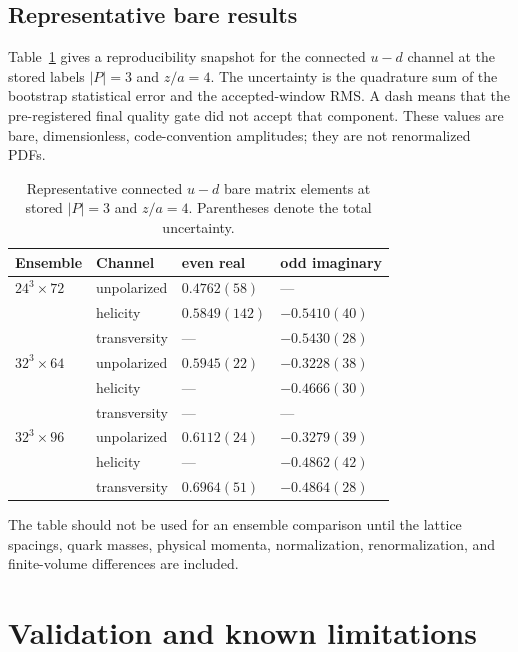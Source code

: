 \documentclass[11pt]{article}
\numberwithin{equation}{section}
\begin{document}
\subsection{Representative bare results}

Table~\ref{tab:representative-results} gives a reproducibility snapshot for
the connected $u-d$ channel at the stored labels $|P|=3$ and $z/a=4$.  The
uncertainty is the quadrature sum of the bootstrap statistical error and the
accepted-window RMS.  A dash means that the pre-registered final quality gate
did not accept that component.  These values are bare, dimensionless,
code-convention amplitudes; they are not renormalized PDFs.

\begin{table}[htbp]
\centering
\caption{Representative connected $u-d$ bare matrix elements at stored
$|P|=3$ and $z/a=4$.  Parentheses denote the total uncertainty.}
\label{tab:representative-results}
\begin{tabular}{llll}
\toprule
Ensemble & Channel & even real & odd imaginary\\
\midrule
$24^3\times72$ & unpolarized & $0.4762(58)$ & ---\\
                 & helicity & $0.5849(142)$ & $-0.5410(40)$\\
                 & transversity & --- & $-0.5430(28)$\\
\addlinespace
$32^3\times64$ & unpolarized & $0.5945(22)$ & $-0.3228(38)$\\
                 & helicity & --- & $-0.4666(30)$\\
                 & transversity & --- & ---\\
\addlinespace
$32^3\times96$ & unpolarized & $0.6112(24)$ & $-0.3279(39)$\\
                 & helicity & --- & $-0.4862(42)$\\
                 & transversity & $0.6964(51)$ & $-0.4864(28)$\\
\bottomrule
\end{tabular}
\end{table}

The table should not be used for an ensemble comparison until the lattice
spacings, quark masses, physical momenta, normalization, renormalization, and
finite-volume differences are included.

\section{Validation and known limitations}
\end{document}
